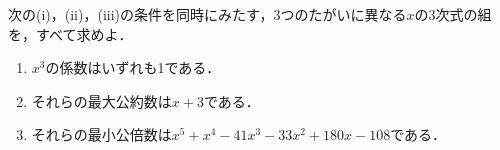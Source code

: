 \documentclass[../../main.tex]{subfiles}
\begin{document}
次の(i)，(ii)，(iii)の条件を同時にみたす，3つのたがいに異なる$x$の3次式の組を，すべて求めよ．
\begin{enumerate}
  \item[(i)] $x^3$の係数はいずれも1である．
  \item[(ii)] それらの最大公約数は$x+3$である．
  \item[(iii)] それらの最小公倍数は$x^5+x^4-41x^3-33x^2+180x-108$である．
\end{enumerate}
\end{document}
